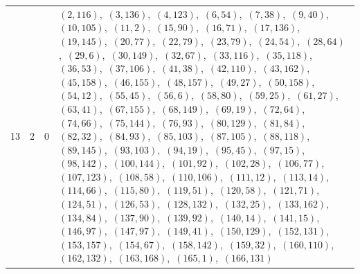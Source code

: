 \documentclass[11pt]{article}
\begin{document}
\begin{longtable}{@{}rrl>{\raggedright\arraybackslash}p{}@{}}
13 & 2 & $0$ & $(2,116)$,\allowbreak\ $(3,136)$,\allowbreak\ $(4,123)$,\allowbreak\ $(6,54)$,\allowbreak\ $(7,38)$,\allowbreak\ $(9,40)$,\allowbreak\ $(10,105)$,\allowbreak\ $(11,2)$,\allowbreak\ $(15,90)$,\allowbreak\ $(16,71)$,\allowbreak\ $(17,136)$,\allowbreak\ $(19,145)$,\allowbreak\ $(20,77)$,\allowbreak\ $(22,79)$,\allowbreak\ $(23,79)$,\allowbreak\ $(24,54)$,\allowbreak\ $(28,64)$,\allowbreak\ $(29,6)$,\allowbreak\ $(30,149)$,\allowbreak\ $(32,67)$,\allowbreak\ $(33,116)$,\allowbreak\ $(35,118)$,\allowbreak\ $(36,53)$,\allowbreak\ $(37,106)$,\allowbreak\ $(41,38)$,\allowbreak\ $(42,110)$,\allowbreak\ $(43,162)$,\allowbreak\ $(45,158)$,\allowbreak\ $(46,155)$,\allowbreak\ $(48,157)$,\allowbreak\ $(49,27)$,\allowbreak\ $(50,158)$,\allowbreak\ $(54,12)$,\allowbreak\ $(55,45)$,\allowbreak\ $(56,6)$,\allowbreak\ $(58,80)$,\allowbreak\ $(59,25)$,\allowbreak\ $(61,27)$,\allowbreak\ $(63,41)$,\allowbreak\ $(67,155)$,\allowbreak\ $(68,149)$,\allowbreak\ $(69,19)$,\allowbreak\ $(72,64)$,\allowbreak\ $(74,66)$,\allowbreak\ $(75,144)$,\allowbreak\ $(76,93)$,\allowbreak\ $(80,129)$,\allowbreak\ $(81,84)$,\allowbreak\ $(82,32)$,\allowbreak\ $(84,93)$,\allowbreak\ $(85,103)$,\allowbreak\ $(87,105)$,\allowbreak\ $(88,118)$,\allowbreak\ $(89,145)$,\allowbreak\ $(93,103)$,\allowbreak\ $(94,19)$,\allowbreak\ $(95,45)$,\allowbreak\ $(97,15)$,\allowbreak\ $(98,142)$,\allowbreak\ $(100,144)$,\allowbreak\ $(101,92)$,\allowbreak\ $(102,28)$,\allowbreak\ $(106,77)$,\allowbreak\ $(107,123)$,\allowbreak\ $(108,58)$,\allowbreak\ $(110,106)$,\allowbreak\ $(111,12)$,\allowbreak\ $(113,14)$,\allowbreak\ $(114,66)$,\allowbreak\ $(115,80)$,\allowbreak\ $(119,51)$,\allowbreak\ $(120,58)$,\allowbreak\ $(121,71)$,\allowbreak\ $(124,51)$,\allowbreak\ $(126,53)$,\allowbreak\ $(128,132)$,\allowbreak\ $(132,25)$,\allowbreak\ $(133,162)$,\allowbreak\ $(134,84)$,\allowbreak\ $(137,90)$,\allowbreak\ $(139,92)$,\allowbreak\ $(140,14)$,\allowbreak\ $(141,15)$,\allowbreak\ $(146,97)$,\allowbreak\ $(147,97)$,\allowbreak\ $(149,41)$,\allowbreak\ $(150,129)$,\allowbreak\ $(152,131)$,\allowbreak\ $(153,157)$,\allowbreak\ $(154,67)$,\allowbreak\ $(158,142)$,\allowbreak\ $(159,32)$,\allowbreak\ $(160,110)$,\allowbreak\ $(162,132)$,\allowbreak\ $(163,168)$,\allowbreak\ $(165,1)$,\allowbreak\ $(166,131)$\\

\end{longtable}
\end{document}
